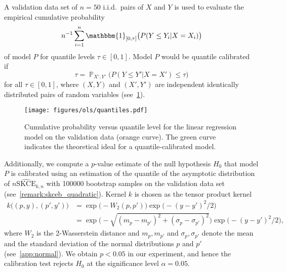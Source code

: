 \documentclass{article}
\DeclareMathOperator{\Prob}{\mathbb{P}}
\begin{document}
A validation data set of $n = 50$ i.i.d.\ pairs of $X$ and $Y$ is used to
evaluate the empirical cumulative probability
\begin{equation*}
    n^{-1} \sum_{i=1}^n \mathbbm{1}_{[0,\tau]}\big(P(Y \leq Y_i | X = X_i)\big)
\end{equation*}
of model $P$ for quantile levels $\tau \in [0, 1]$. Model $P$ would be quantile
calibrated~\citep{Song2019} if
\begin{equation*}
    \tau = \Prob_{X',Y'}\big(P(Y \leq Y' | X = X') \leq \tau \big)
\end{equation*}
for all $\tau \in [0,1]$, where $(X, Y)$ and $(X', Y')$ are independent identically
distributed pairs of random variables (see~\cref{fig:ols_quantiles}).

\begin{figure}[hpt]
    \begin{center}
        \texttt{[image: figures/ols/quantiles.pdf]}
        \caption{Cumulative probability versus quantile level for the linear regression
        model on the validation data (orange curve). The green curve indicates the theoretical ideal
        for a quantile-calibrated model.}
        \label{fig:ols_quantiles}
    \end{center}
\end{figure}

Additionally, we compute a $p$-value estimate of the null hypothesis $H_0$ that model $P$
is calibrated using an estimation of the quantile of the asymptotic distribution
of $n \widehat{\mathrm{SKCE}}_{k,n}$ with 100000 bootstrap samples
on the validation data set (see~\cref{remark:skceb_quadratic}). Kernel $k$ is chosen
as the tensor product kernel
\begin{equation*}
    \begin{split}
        k\big((p, y), (p', y')\big) &= \exp{\big(-W_2(p, p')\big)} \exp{\big(-(y - y')^2/2 \big)} \\
        &= \exp{\bigg(-\sqrt{(m_p - m_{p'})^2 + (\sigma_p - \sigma_{p'})^2}\bigg)} \exp{\big(- (y - y')^2/2\big)},
    \end{split}
\end{equation*}
where $W_2$ is the 2-Wasserstein distance and $m_p, m_{p'}$ and $\sigma_p, \sigma_{p'}$ denote
the mean and the standard deviation of the normal distributions $p$ and $p'$ (see~\cref{app:normal}).
We obtain $p < 0.05$ in our experiment, and hence the calibration test rejects $H_0$ at the
significance level $\alpha = 0.05$.
\end{document}
